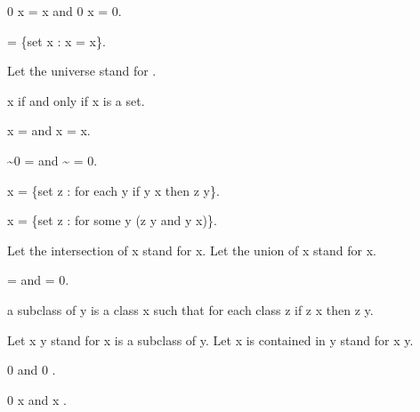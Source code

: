 \documentclass[a4paper,draft]{amsproc}
\begin{document}
\begin{forthel}
\begin{theorem}[17]
0 \cup x = x and 0 \cap x = 0.
\end{theorem}

\begin{definition}[18]
 = \{set x : x = x\}.
\end{definition}
Let the universe stand for .

\begin{theorem}[19]
x \in {} if and only if x is a set.
\end{theorem}

\begin{theorem}[20]
x \cup {} =  and x \cap {} = x.
\end{theorem}

\begin{theorem}[21]
\sim 0 =  and \sim {} = 0.
\end{theorem}

\begin{definition}[22]
\bigcap x = \{set z : for each y if y \in x then z \in y\}.
\end{definition}

\begin{definition}[23]
\bigcup x = \{set z : for some y (z \in y and y \in x)\}.
\end{definition}

Let the intersection of x stand for \bigcap x.
Let the union of x stand for \bigcup x.

\begin{theorem}[24]
 =  and  = 0.
\end{theorem}

\begin{definition}[25]
a subclass of y is a class x such that for each class z if z \in x then z \in y.
\end{definition}

Let x \subset y stand for x is a subclass of y.
Let x is contained in y stand for x \subset y.

\begin{lemma}
0  and 0 .
\end{lemma}

\begin{theorem}[26]
0 \subset x and x \subset {}.
\end{theorem}


\end{forthel}
\end{document}

